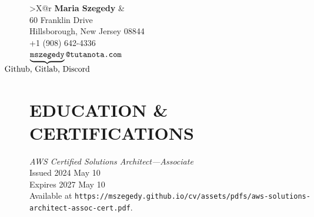 \documentclass{article}
\begin{document}

\begin{tabularx}{\textwidth}{>{\centering\arraybackslash}X@{}r}
  {\large\bf Maria Szegedy} &
   \\[0.6em]\vspace{0em}
  {60 Franklin Drive} \\
  {Hillsborough, New Jersey 08844} \\
  {+1 (908) 642-4336} \\
  {\fontsize{12}{12}%
    $\underbrace{\texttt{mszegedy}}%
    _{\textstyle\text{\makebox[0pt]{\fontsize{10}{10}\selectfont Github, Gitlab, Discord}}}%
    \texttt{@tutanota.com}$
  }
\end{tabularx}



\section*{EDUCATION \& CERTIFICATIONS}

{\it AWS Certified Solutions Architect---Associate} \\
\hspace*{3em} Issued 2024 May 10 \\
\hspace*{3em} Expires 2027 May 10 \\
{\fontsize{9}{10}\selectfont
  Available at
  \texttt{https://mszegedy.github.io/cv/assets/pdfs/aws-solutions-architect-assoc-cert.pdf}.}
\end{document}
